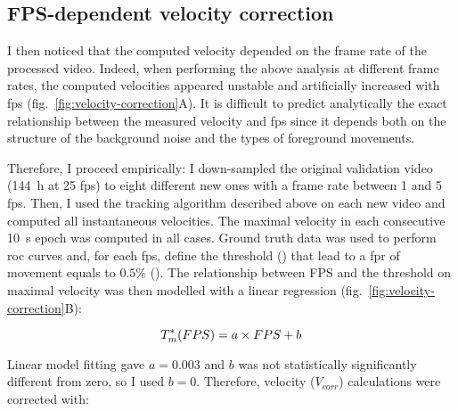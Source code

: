 

\subsection{FPS-dependent velocity correction}
\label{subsec:velocity-correction}

I then noticed that the computed velocity depended on the frame rate of the processed video.
Indeed, when performing the above analysis at different frame rates, the computed velocities appeared unstable and artificially increased with \gls{fps} (fig.~\ref{fig:velocity-correction}A).
It is difficult to predict analytically the exact relationship between the measured velocity and \gls{fps} since it depends both on the structure of the background noise and the types of foreground movements.





Therefore, I proceed empirically: I down-sampled the original validation video (144~h at 25 \gls{fps}) to eight different new ones with a frame rate between 1 and 5 \gls{fps}. 
Then, I used the tracking algorithm described above on each new video and computed all instantaneous velocities.
The maximal velocity in each consecutive 10~s epoch  was computed in all cases.
Ground truth data was used to perform \gls{roc} curves and, for each \gls{fps}, define the threshold () that lead to a \gls{fpr} of movement equals to $0.5\%$ ().
The relationship between FPS and the threshold on maximal velocity was then modelled with a linear regression (fig.~\ref{fig:velocity-correction}B):

\begin{equation}
{
	T^*_m(FPS) = a \times{} FPS + b
}
\label{eq:velocor}
\end{equation}



Linear model fitting gave $a = 0.003$ and $b$ was not statistically significantly different from zero, so I used $b=0$.
Therefore, velocity ($V_{corr}$) calculations were corrected with:


